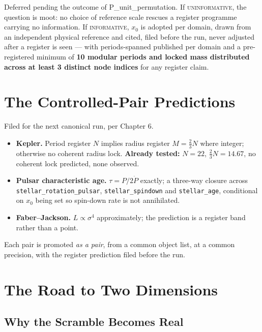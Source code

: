 \documentclass[11pt, letterpaper, openany]{book}
\begin{document}
\begin{predictionbox}
Deferred pending the outcome of P\_unit\_permutation. If \textsc{uninformative}, the question is
moot: no choice of reference scale rescues a register programme carrying no information. If
\textsc{informative}, $x_0$ is adopted per domain, drawn from an independent physical reference
and cited, filed before the run, never adjusted after a register is seen --- with periods-spanned
published per domain and a pre-registered minimum of \textbf{10 modular periods and locked mass
distributed across at least 3 distinct node indices} for any register claim.
\end{predictionbox}

\section{The Controlled-Pair Predictions}

\begin{predictionbox}
Filed for the next canonical run, per Chapter 6.

\begin{itemize}
    \item \textbf{Kepler.} Period register $N$ implies radius register $M = \tfrac{2}{3}N$ where
          integer; otherwise no coherent radius lock. \textbf{Already tested:} $N = 22$,
          $\tfrac{2}{3}N = 14.67$, no coherent lock predicted, none observed.
    \item \textbf{Pulsar characteristic age.} $\tau = P/2\dot{P}$ exactly; a three-way closure
          across \texttt{stellar\_rotation\_pulsar}, \texttt{stellar\_spindown} and
          \texttt{stellar\_age}, conditional on $x_0$ being set so spin-down rate is not
          annihilated.
    \item \textbf{Faber--Jackson.} $L \propto \sigma^4$ approximately; the prediction is a
          register band rather than a point.
\end{itemize}

\noindent Each pair is promoted \emph{as a pair}, from a common object list, at a common
precision, with the register prediction filed before the run.
\end{predictionbox}

\section{The Road to Two Dimensions}

\subsection{Why the Scramble Becomes Real}
\end{document}
